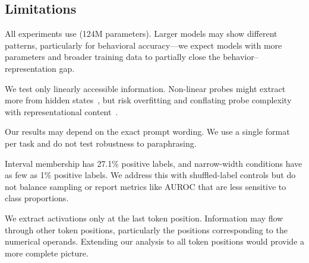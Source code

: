 \subsection{Limitations}

 All experiments use \gptsmall (124M parameters). Larger models may show different patterns, particularly for behavioral accuracy---we expect models with more parameters and broader training data to partially close the behavior--representation gap.

 We test only linearly accessible information. Non-linear probes might extract more from hidden states~\citep{alain2017understanding}, but risk overfitting and conflating probe complexity with representational content~\citep{hewitt2019designing}.

 Our results may depend on the exact prompt wording. We use a single format per task and do not test robustness to paraphrasing.

 Interval membership has 27.1\% positive labels, and narrow-width conditions have as few as 1\% positive labels. We address this with shuffled-label controls but do not balance sampling or report metrics like AUROC that are less sensitive to class proportions.

 We extract activations only at the last token position. Information may flow through other token positions, particularly the positions corresponding to the numerical operands. Extending our analysis to all token positions would provide a more complete picture.
